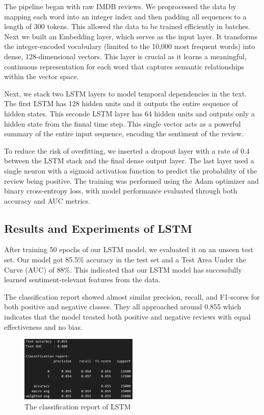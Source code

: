 The pipeline began with raw IMDB reviews. We proprocessed the data by mapping each word into an integer index and then padding all sequences to a length of 300 tokens. This allowed the data to be trained efficiently in batches. Next we built an Embedding layer, which serves as the input layer. It transforms the integer-encoded vocabulary (limited to the 10,000 most frequent words) into dense, 128-dimensional vectors. This layer is crucial as it learns a meaningful, continuous representation for each word that captures semantic relationships within the vector space.

Next, we stack two LSTM layers to model temporal dependencies in the text. The first LSTM has 128 hidden units and it outputs the entire sequence of hidden states. This seconde LSTM layer has 64 hidden units and outputs only a hidden state from the finnal time step. This single vector acts as a powerful summary of the entire input sequence, encoding the sentiment of the review.

To reduce the risk of overfitting, we inserted a dropout layer with a rate of 0.4 between the LSTM stack and the final dense output layer. The last layer used a single neuron with a sigmoid activation function to predict the probability of the review being positive. The training was performed using the Adam optimizer and binary cross-entropy loss, with model performance evaluated through both accuracy and AUC metrics.

\subsection{Results and Experiments of LSTM}
After training 50 epochs of our LSTM model, we evaluated it on an unseen test set. Our model got 85.5\% accuracy in the test set and a Test Area Under the Curve (AUC) of 88\%. This indicated that our LSTM model has successfully learned sentiment-relevant features from the data.

The classification report showed almost similar precision, recall, and F1-scores for both positive and negative classes. They all approached around 0.855 which indicates that the model treated both positive and negative reviews with equal effectiveness and no bias.

\begin{figure}[ht]
    \centering
    \includegraphics[width=0.5\textwidth]{pics/lstm_report.png}
    \caption{The classification report of LSTM}
\end{figure}

